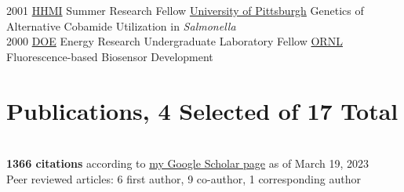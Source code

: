 \documentclass[letterpaper]{twentysecondcv3} %
\begin{document}
\begin{twenty}
    \twentyitem
   	{2001}
		{}
        {\href{https://www.hhmi.org/}{HHMI} Summer Research Fellow}
        {\href{https://www.pitt.edu/}{University of Pittsburgh}}
        {Genetics of Alternative Cobamide Utilization in \textit{Salmonella}}\\

    \twentyitem
        {2000}
		{}
        {\href{https://www.energy.gov/}{DOE} Energy Research Undergraduate Laboratory Fellow}
        {\href{https://www.ornl.gov/}{ORNL}}
        {Fluorescence-based Biosensor Development}

\end{twenty}

\section{Publications, 4 Selected of 17 Total}\\
\textbf{1366 citations} according to \href{https://scholar.google.com/citations?user=bgdnUn8AAAAJ&hl=en}{my Google Scholar page} as of March 19, 2023\\
Peer reviewed articles: 6 first author, 9 co-author, 1 corresponding author

\nocite{Michalak2020, Gaby2014, Gaby2012, Gaby2011}

%
%
%
%
\end{document}
